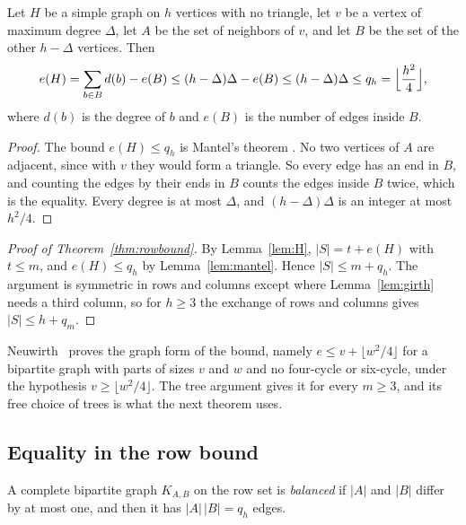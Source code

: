 \begin{lemma}[Mantel]\label{lem:mantel}
Let $H$ be a simple graph on $h$ vertices with no triangle, let $v$ be a vertex of maximum degree $\Delta$, let $A$ be the set of neighbors of $v$, and let $B$ be the set of the other $h-\Delta$ vertices. Then
\[
e(H)=\sum_{b\in B}d(b)-e(B)\le(h-\Delta)\Delta-e(B)\le(h-\Delta)\Delta\le q_h=\Bigl\lfloor\frac{h^2}4\Bigr\rfloor,
\]
where $d(b)$ is the degree of $b$ and $e(B)$ is the number of edges inside $B$.
\end{lemma}

\begin{proof}
The bound $e(H)\le q_h$ is Mantel's theorem \cite{mantel1907}. No two vertices of $A$ are adjacent, since with $v$ they would form a triangle. So every edge has an end in $B$, and counting the edges by their ends in $B$ counts the edges inside $B$ twice, which is the equality. Every degree is at most $\Delta$, and $(h-\Delta)\Delta$ is an integer at most $h^2/4$.
\end{proof}

\begin{proof}[Proof of Theorem~\ref{thm:rowbound}]
By Lemma~\ref{lem:H}, $|S|=t+e(H)$ with $t\le m$, and $e(H)\le q_h$ by Lemma~\ref{lem:mantel}. Hence $|S|\le m+q_h$. The argument is symmetric in rows and columns except where Lemma~\ref{lem:girth} needs a third column, so for $h\ge3$ the exchange of rows and columns gives $|S|\le h+q_m$.
\end{proof}

Neuwirth~\cite[Theorem~1(ii)]{neuwirth2001} proves the graph form of the bound, namely $e\le v+\lfloor w^2/4\rfloor$ for a bipartite graph with parts of sizes $v$ and $w$ and no four-cycle or six-cycle, under the hypothesis $v\ge\lfloor w^2/4\rfloor$. The tree argument gives it for every $m\ge3$, and its free choice of trees is what the next theorem uses.

\subsection{Equality in the row bound}

A complete bipartite graph $K_{A,B}$ on the row set is \emph{balanced} if $|A|$ and $|B|$ differ by at most one, and then it has $|A|\,|B|=q_h$ edges.

